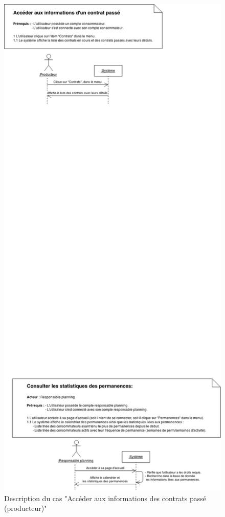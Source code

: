 \documentclass[12pt]{report}
\begin{document}
\begin{figure}[!h]
\centering
\includegraphics[width=1.\textwidth]{./ressources/desc_UC_contrats_passes.png}
\caption{Description du cas "Accéder aux informations des contrats passé (producteur)"}
\end{figure}
\clearpage
\end{document}
